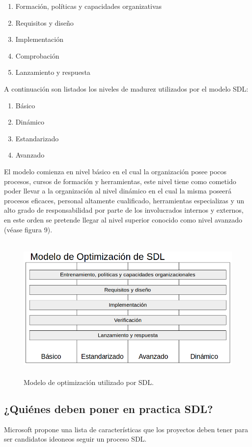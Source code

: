 \documentclass[runningheads,a4paper]{llncs}
\begin{document}
\begin{enumerate}
	\item Formación, políticas y capacidades organizativas 
	\item Requisitos y diseño 
	\item Implementación 
	\item Comprobación 
	\item Lanzamiento y respuesta 
\end{enumerate}

A continuación son listados los niveles de madurez utilizados por el modelo \gls{SDL}:

\begin{enumerate}
\item Básico 
\item Dinámico 
\item Estandarizado 
\item Avanzado 
\end{enumerate}

El modelo comienza en nivel básico en el cual la organización posee pocos procesos, cursos de formación y herramientas, este nivel tiene como cometido poder llevar a la organización al nivel dinámico en el cual la misma poseerá procesos eficaces, personal altamente cualificado, herramientas especializas y un alto grado de responsabilidad por parte de los involucrados internos y externos, en este orden se pretende llegar al nivel superior conocido como nivel avanzado (véase figura 9). \\

\begin{figure}
\centering
\includegraphics[height=7.2cm, width=12.0cm]{sa_figura_9}
\caption{Modelo de optimización utilizado por \gls{SDL}.}
\label{fig:example}
\end{figure}


\subsection{¿Quiénes deben poner en practica \gls{SDL}?}
Microsoft propone una lista de características que los proyectos deben tener para ser candidatos ideoneos seguir un proceso \gls{SDL}.
\end{document}
